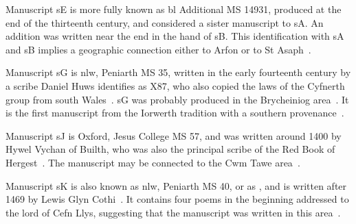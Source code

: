 Manuscript \gls{sE} is more fully known as \gls{bl} Additional MS 14931,  produced at the end of the thirteenth century, and  considered a sister manuscript to \gls{sA}. An addition was written near the end in the hand of \gls{sB}. This identification with \gls{sA} and \gls{sB} implies a geographic connection either to Arfon or to St Asaph~\autocite[100]{charles-edwards_welsh_1989}.

Manuscript \gls{sG} is \gls{nlw}, Peniarth MS 35, written in the early fourteenth century by a scribe  Daniel Huws identifies as X87, who also copied the laws of the Cyfnerth group from south Wales~\autocite{smith_tei_2013}. \Gls{sG} was probably produced in the Brycheiniog area~\autocite[v]{elias_golygiad_2007}. It is the first manuscript from the Iorwerth tradition with a southern provenance~\autocite{charles-edwards_introduction_1986}.

Manuscript \gls{sJ} is Oxford, Jesus College MS 57, and was written around 1400 by Hywel Vychan of Builth, who was also the principal scribe of the Red Book of Hergest~\autocite[100]{charles-edwards_welsh_1989}. The manuscript may be connected to the Cwm Tawe area~\autocite{james_llwyr_1993}.

Manuscript \gls{sK} is also known as \gls{nlw}, Peniarth MS 40, or as , and is written after 1469 by Lewis Glyn Cothi~\autocite{roberts_cyfraith_2011}. It contains four poems in the beginning addressed to the lord of Cefn Llys, suggesting that the manuscript was written in this area~\autocite[374]{evans_report_1899}.

